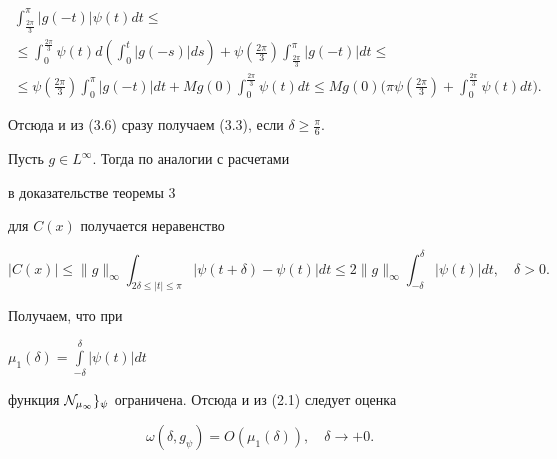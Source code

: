 \begin{pf}
\begin{multline*}
\int_{\frac{2\pi}{3}}^\pi|g(-t)|\psi(t)dt\le \\


%


\le\int_0^{\frac{2\pi}{3}}\psi(t)d\left(\int_0^t|g(-s)|ds\right)+


\psi\left(\frac{2\pi}{3}\right)


\int_{\frac{2\pi}{3}}^\pi|g(-t)|dt\le \\


%


\le\psi\left(\frac{2\pi}{3}\right)\int_0^\pi|g(-t)|dt+


Mg(0)\int_0^{\frac{2\pi}{3}}\psi(t)dt


\le Mg(0)\bigg(\pi\psi\left(\frac{2\pi}{3}\right)+


\int_0^{\frac{2\pi}{3}}\psi(t)dt\bigg).


\end{multline*}


Отсюда и из (3.6) сразу получаем (3.3), если $\delta\ge\frac{\pi}{6}$.


\end{pf}





\begin{note}


Пусть $g\in L^\infty$. Тогда по аналогии с расчетами


в доказательстве теоремы 3


для $C(x)$ получается неравенство


$$


|C(x)|\le\|g\|_\infty\int_{2\delta\le|t|\le\pi}|\psi(t+\delta)-\psi(t)|dt\le


2\|g\|_\infty\int_{-\delta}^\delta|\psi(t)|dt,\quad \delta>0.


$$


Получаем, что при


$\mu_1(\delta)=\int\limits_{-\delta}^\delta|\psi(t)|dt$


функция $\cal N_{\mu_1} g_\psi$ ограничена. Отсюда и из (2.1) следует оценка


\begin{equation}


\omega(\delta,g_\psi)=O(\mu_1(\delta)),


\quad \delta\to+0.


\end{equation}


\end{note}





